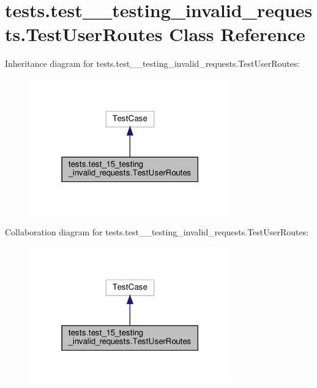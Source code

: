 \hypertarget{classtests_1_1test__15__testing__invalid__requests_1_1_test_user_routes}{}\section{tests.\+test\+\_\+\_\+testing\+\_\+invalid\+\_\+requests.\+Test\+User\+Routes Class Reference}
\label{classtests_1_1test__15__testing__invalid__requests_1_1_test_user_routes}


Inheritance diagram for tests.\+test\+\_\+\_\+testing\+\_\+invalid\+\_\+requests.\+Test\+User\+Routes\+:
\nopagebreak
\begin{figure}[H]
\begin{center}
\leavevmode
\includegraphics[width=247pt]{classtests_1_1test__15__testing__invalid__requests_1_1_test_user_routes__inherit__graph}
\end{center}
\end{figure}


Collaboration diagram for tests.\+test\+\_\+\_\+testing\+\_\+invalid\+\_\+requests.\+Test\+User\+Routes\+:
\nopagebreak
\begin{figure}[H]
\begin{center}
\leavevmode
\includegraphics[width=247pt]{classtests_1_1test__15__testing__invalid__requests_1_1_test_user_routes__coll__graph}
\end{center}
\end{figure}
